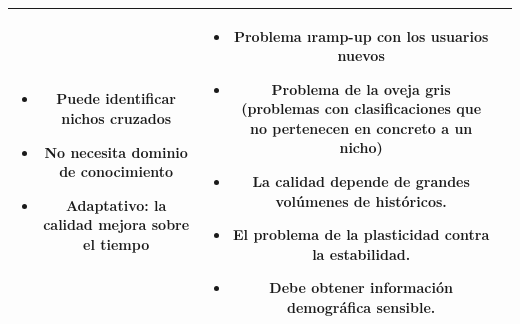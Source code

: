 \begin{table}[h]
\begin{center}
\begin{tabular}{| c | c | c |}
		 	\parbox{5cm}{\begin{itemize}[topsep=0pt]
		 		\item Puede identificar nichos cruzados
		 		\item No necesita dominio de conocimiento
		 		\item Adaptativo: la calidad mejora sobre el tiempo
		 	\end{itemize}} &
		 	\parbox{5cm}{\begin{itemize}[topsep=0pt]
		 		\item Problema \i{ramp-up} con los usuarios nuevos
		 		\item Problema de la oveja gris (problemas con clasificaciones que no pertenecen en concreto a un nicho)
		 		\item La calidad depende de grandes volúmenes de históricos.
		 		\item El problema de la plasticidad contra la estabilidad.
		 		\item Debe obtener información demográfica sensible.
		 	\end{itemize}} \\
		 \bottomrule
			\end{tabular}
	 	\end{center}
		\end{table}
